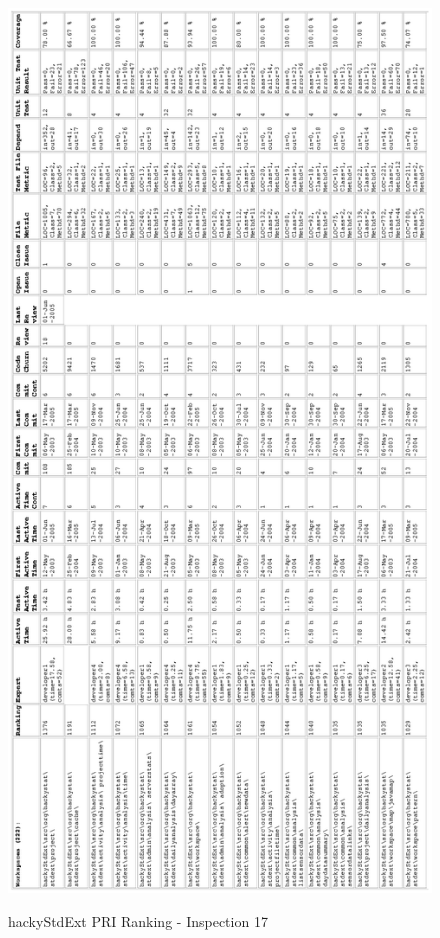 \begin{figure}[htb]
  \centering
  \caption{hackyStdExt PRI Ranking - Inspection 17}
  \includegraphics[totalheight=1.0\textheight]{figs/Results/17_2005-06-02-hackyStdExt-printable.eps}
  \label{fig:inspection17-hackyStdExt-ranking}
\end{figure}



